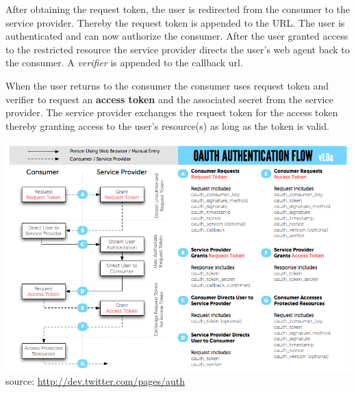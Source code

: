 After obtaining the request token, the user is redirected from the
consumer to the service provider. Thereby the request token is
appended to the URL. The user is authenticated and can now
authorize the consumer. After the user granted access to the
restricted resource the service provider directs the user's web
agent back to the consumer. A \emph{verifier} is appended to the
callback url.

When the user returns to the consumer the consumer uses request
token and verifier to request an \textbf{access token} and the
associated secret from the service provider. The service provider
exchanges the request token for the access token thereby granting
access to the user's resource(s) as long as the token is valid.

\includegraphics{../oauth_diagram.png}\\source:
\href{http://dev.twitter.com/pages/auth}{http://dev.twitter.com/pages/auth}
